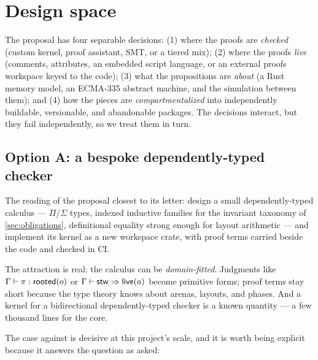 \section{Design space}
\label{sec:design}

The proposal has four separable decisions: (1) where the proofs are
\emph{checked} (custom kernel, proof assistant, SMT, or a tiered mix);
(2) where the proofs \emph{live} (comments, attributes, an embedded
script language, or an external proofs workspace keyed to the code);
(3) what the propositions are \emph{about} (a Rust memory model, an
ECMA-335 abstract machine, and the simulation between them); and (4)
how the pieces are \emph{compartmentalized} into independently
buildable, versionable, and abandonable packages. The decisions
interact, but they fail independently, so we treat them in turn.

\subsection{Option A: a bespoke dependently-typed checker}
\label{sec:design-custom}

The reading of the proposal closest to its letter: design a small
dependently-typed calculus --- $\Pi$/$\Sigma$ types, indexed inductive
families for the invariant taxonomy of \cref{sec:obligations},
definitional equality strong enough for layout arithmetic --- and
implement its kernel as a new workspace crate, with proof terms carried
beside the code and checked in CI.

The attraction is real: the calculus can be \emph{domain-fitted}.
Judgments like $\Gamma \vdash \pi : \mathsf{rooted}(o)$ or
$\Gamma \vdash \mathsf{stw} \Rightarrow \mathsf{live}(a)$ become primitive forms; proof
terms stay short because the type theory knows about arenas, layouts,
and phases. And a kernel for a bidirectional dependently-typed checker
is a known quantity --- a few thousand lines for the core.

The case against is decisive at this project's scale, and it is worth
being explicit because it answers the question as asked:

